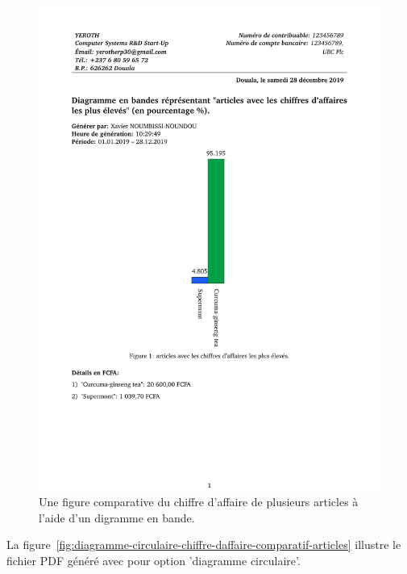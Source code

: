 \begin{figure}[!htbp]
	\centering
	\includegraphics[scale=0.65]{images/diagramme-bande-chiffre-daffaire-comparatif-articles.pdf}
	\caption{Une figure comparative du chiffre d'affaire de
		plusieurs articles \`a l'aide d'un digramme en bande.}
	\label{fig:diagramme-bande-chiffre-daffaire-comparatif-articles}
\end{figure}

La figure~\ref{fig:diagramme-circulaire-chiffre-daffaire-comparatif-articles}
illustre le fichier PDF g\'en\'er\'e avec pour option 'diagramme circulaire'.

